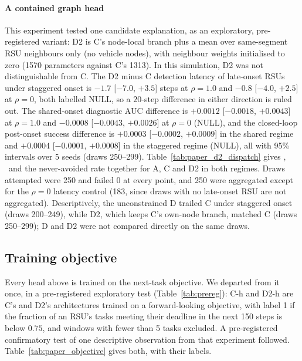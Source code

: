 \paragraph*{A contained graph head}
This experiment tested one candidate explanation, as an exploratory, pre-registered variant: D2 is C's node-local branch plus a mean over same-segment RSU neighbours only (no vehicle nodes), with neighbour weights initialised to zero (1570 parameters against C's 1313).
In this simulation, D2 was not distinguishable from C.
The D2 minus C detection latency of late-onset RSUs under staggered onset is $-1.7$ [$-7.0$, $+3.5$] steps at $\rho=1.0$ and $-0.8$ [$-4.0$, $+2.5$] at $\rho=0$, both labelled NULL, so a $20$-step difference in either direction is ruled out.
The shared-onset diagnostic AUC difference is $+0.0012$ [$-0.0018$, $+0.0043$] at $\rho=1.0$ and $-0.0008$ [$-0.0043$, $+0.0026$] at $\rho=0$ (NULL), and the closed-loop post-onset success difference is $+0.0003$ [$-0.0002$, $+0.0009$] in the shared regime and $+0.0004$ [$-0.0001$, $+0.0008$] in the staggered regime (NULL), all with 95\% intervals over 5 seeds (draws 250--299).
Table~\ref{tab:paper_d2_dispatch} gives \nav, \nwin\ and the never-avoided rate together for A, C and D2 in both regimes.
Draws attempted were 250 and failed 0 at every point, and 250 were aggregated except for the $\rho=0$ latency control (183, since draws with no late-onset RSU are not aggregated).
\latcaveat
Descriptively, the unconstrained D trailed C under staggered onset (draws 200--249), while D2, which keeps C's own-node branch, matched C (draws 250--299); D and D2 were not compared directly on the same draws.





\subsection{Training objective}
\label{sec:objective}

Every head above is trained on the next-task objective.
We departed from it once, in a pre-registered exploratory test (Table~\ref{tab:prereg}): C-h and D2-h are C's and D2's architectures trained on a forward-looking objective, with label 1 if the fraction of an RSU's tasks meeting their deadline in the next 150 steps is below $0.75$, and windows with fewer than 5 tasks excluded.
A pre-registered confirmatory test of one descriptive observation from that experiment followed.
Table~\ref{tab:paper_objective} gives both, with their labels.

